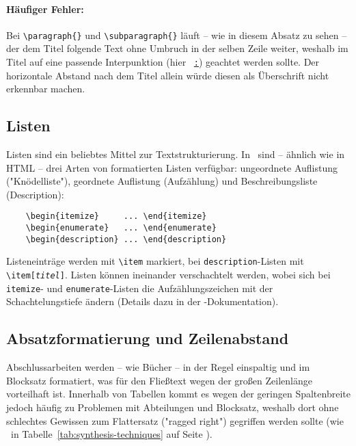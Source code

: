 \paragraph{Häufiger Fehler:} Bei \verb!\paragraph{}! und \verb!\subparagraph{}!
läuft -- wie in diesem Absatz zu sehen -- der dem Titel folgende Text ohne
Umbruch in der selben Zeile weiter, weshalb im Titel auf eine passende
Interpunktion (hier \zB\ \underline{\texttt{:}}) geachtet werden sollte. Der
horizontale Abstand nach dem Titel allein würde diesen als Überschrift nicht
erkennbar machen.

\subsection{Listen}

Listen sind ein beliebtes Mittel zur Textstrukturierung. In \latex\ sind --
ähnlich wie in HTML -- drei Arten von formatierten Listen verfügbar:
ungeordnete Auflistung ("Knödelliste"), geordnete Auflistung (Aufzählung) und
Beschreibungsliste (Description):
%
\begin{verbatim}
    \begin{itemize}     ... \end{itemize}
    \begin{enumerate}   ... \end{enumerate}
    \begin{description} ... \end{description}
\end{verbatim}
%
Listeneinträge werden mit \verb!\item! markiert, bei
\texttt{description}-Listen mit \verb!\item[!\texttt{\em titel}\verb!]!.
Listen können ineinander verschachtelt werden, wobei sich bei \texttt{itemize}-
und \texttt{enumerate}-Listen die Aufzählungszeichen mit der Schachtelungstiefe
ändern (Details dazu in der \latex-Dokumentation).

\subsection{Absatzformatierung und Zeilenabstand}

Abschlussarbeiten werden -- wie Bücher -- in der Regel einspaltig und im
Blocksatz formatiert, was für den Fließtext wegen der großen Zeilenlänge
vorteilhaft ist. Innerhalb von Tabellen kommt es wegen der geringen
Spaltenbreite jedoch häufig zu Problemen mit Abteilungen und Blocksatz,
weshalb dort ohne schlechtes Gewissen zum Flattersatz ("ragged right")
gegriffen werden sollte (wie \zB\ in Tabelle~\ref{tab:synthesis-techniques} auf
Seite \pageref{tab:synthesis-techniques}).

